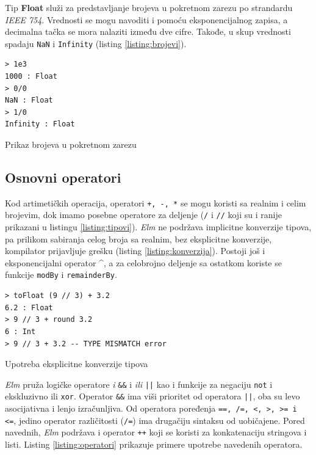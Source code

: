 \documentclass[12pt,oneside]{memoir}
\begin{document}
Tip \textbf{Float} služi za predstavljanje brojeva u pokretnom zarezu po strandardu
\emph{IEEE 754}. Vrednosti se mogu navoditi i pomoću eksponencijalnog zapisa, a decimalna 
tačka se mora nalaziti između dve cifre. Takođe, u skup vrednosti spadaju \texttt{NaN} i
\texttt{Infinity} (listing \ref{listing:brojevi}).

\begin{listing}[ht]
\begin{verbatim}
> 1e3
1000 : Float
> 0/0 
NaN : Float
> 1/0 
Infinity : Float
\end{verbatim}
\caption{Prikaz brojeva u pokretnom zarezu}
\label{listing:brojevi}
\end{listing}


\subsection{Osnovni operatori}
Kod artimetičkih operacija, operatori \texttt{+, -, *} se mogu koristi sa realnim i 
celim brojevim, dok imamo posebne operatore za deljenje (\texttt{{/}} i \texttt{{//}} koji
su i ranije prikazani u listingu \ref{listing:tipovi}). \emph{Elm} ne podržava implicitne konverzije
tipova, pa prilikom sabiranja celog broja sa realnim, bez eksplicitne konverzije, kompilator
prijavljuje grešku (listing \ref{listing:konverzija}). Postoji još i eksponencijalni operator \^{},
a za celobrojno deljenje sa ostatkom koriste se funkcije \texttt{modBy} i \texttt{remainderBy}.
\begin{listing}[h]
\begin{verbatim}
> toFloat (9 // 3) + 3.2
6.2 : Float
> 9 // 3 + round 3.2
6 : Int
> 9 // 3 + 3.2 -- TYPE MISMATCH error
\end{verbatim}
\caption{Upotreba eksplicitne konverzije tipova}
\label{listing:konverzija}
\end{listing}

\emph{Elm} pruža logičke operatore \emph{i} \texttt{\&\&} i  \emph{ili} \texttt{||} kao i funkcije za negaciju 
\texttt{not} i ekskluzivno ili \texttt{xor}. Operator \texttt{\&\&} ima viši prioritet 
od operatora \texttt{||}, oba su levo asocijativna i lenjo izračunljiva. Od operatora poređenja 
\texttt{==, /=, <, >, >= i <=}, jedino operator različitosti (\texttt{/=}) ima drugačiju
sintaksu od uobičajene. Pored navednih, \emph{Elm} podržava i operator \texttt{++} koji se koristi za
konkatenaciju stringova i listi. Listing \ref{listing:operatori} prikazuje primere upotrebe 
navedenih operatora.
\end{document}
